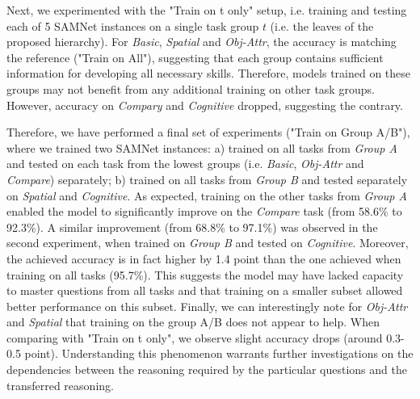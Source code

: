 Next, we experimented with the "Train on t only" setup, i.e. training and testing each of 5 SAMNet instances on a single task group $t$ (i.e. the leaves of the proposed hierarchy).
For \textit{Basic}, \textit{Spatial} and \textit{Obj-Attr}, the accuracy is matching the reference ("Train on All"), suggesting that each group contains sufficient information for developing all necessary skills.
Therefore, models trained on these groups may not benefit from any additional training on other task groups.
However, accuracy on \textit{Compary} and \textit{Cognitive} dropped, suggesting the contrary.

Therefore, we have performed a final set of experiments ("Train on Group A/B"), where we trained two SAMNet instances: a) trained on all tasks from \textit{Group A} and tested on each task from the lowest groups (i.e. \textit{Basic}, \textit{Obj-Attr} and \textit{Compare}) separately; b) trained on all tasks from \textit{Group B} and tested separately on \textit{Spatial} and \textit{Cognitive}.
As expected, training on the other tasks from \textit{Group A} enabled the model to significantly improve on the \textit{Compare} task (from 58.6\% to 92.3\%).
A similar improvement (from 68.8\% to 97.1\%) was observed in the second experiment, when trained on \textit{Group B} and tested on \textit{Cognitive}.
Moreover, the achieved accuracy is in fact higher by 1.4 point than the one achieved when training on all tasks (95.7\%).
This suggests the model may have lacked capacity to master questions from all tasks and that training on a smaller subset allowed better performance on this subset.
Finally, we can interestingly note for \textit{Obj-Attr} and \textit{Spatial} that training on the group A/B does not appear to help. When comparing with "Train on t only", we observe slight accuracy drops (around 0.3-0.5 point).
Understanding this phenomenon warrants further investigations on the dependencies between the reasoning required by the particular questions and the transferred reasoning.

